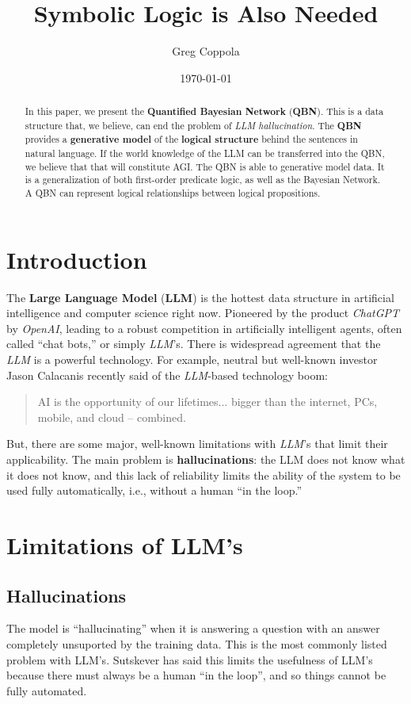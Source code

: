 \documentclass[12pt]{article}
\title{Symbolic Logic is Also Needed}
\author{Greg Coppola}
\date{\today}
\begin{document}
\maketitle


\begin{abstract}
In this paper, we present the {\bf Quantified Bayesian Network} ({\bf QBN}).
This is a data structure that, we believe, can end the problem of {\em LLM hallucination}.
The {\bf QBN} provides a {\bf generative model} of the {\bf logical structure} behind the sentences in natural language.
If the world knowledge of the LLM can be transferred into the QBN, we believe that that will constitute AGI.
The QBN is able to generative model data.
It is a generalization of both first-order predicate logic, as well as the Bayesian Network.
A QBN can represent logical relationships between logical propositions.
\end{abstract}
\section{Introduction}
The {\bf Large Language Model} ({\bf LLM}) is the hottest data structure in artificial intelligence and computer science right now.
Pioneered by the product {\em ChatGPT} by {\em OpenAI},
leading to a robust competition in artificially intelligent agents, often called ``chat bots,'' or simply {\em LLM}'s.
There is widespread agreement that the {\em LLM} is a powerful technology.
For example, neutral but well-known investor Jason Calacanis recently said of the {\em LLM}-based technology boom:
\begin{quote}
    AI is the opportunity of our lifetimes... 
    bigger than the internet, PCs, mobile, and cloud -- combined.  
    \cite{Jason2023}
\end{quote}
But, there are some major, well-known limitations with {\em LLM}'s that limit their applicability.
The main problem is {\bf hallucinations}: the LLM does not know what it does not know, and this lack of reliability limits the ability of the system to be used fully automatically, i.e., without a human ``in the loop.''
\section{Limitations of LLM's}
\subsection{Hallucinations}
The model is ``hallucinating'' when it is answering a question with an answer completely unsuported by the training data.
This is the most commonly listed problem with LLM's.
Sutskever \cite{sutskever:huang:2023} has said this limits the usefulness of LLM's because there must always be a human ``in the loop'', and so things cannot be fully automated.
\end{document}
